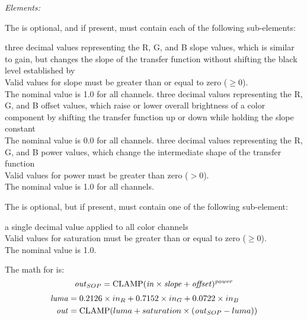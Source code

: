 \emph{Elements:}
\begin{xmlfields}
	\xmlitem[SOPNode][optional] The  is optional, and if present, must contain each of the following sub-elements:
	\begin{xmlfields}
		\xmlitemd[Slope] three decimal values representing the R, G, and B slope values, which 
		is similar to gain, but changes the slope of the transfer function without shifting the black level established by  \\
		Valid values for slope must be greater than or equal to zero ($\geq 0$). \\
		The nominal value is 1.0 for all channels.
		\xmlitemd[Offset] three decimal values representing the R, G, and B offset values, which raise or lower overall brightness of a color component by shifting the transfer function up or down while holding the slope constant \\
		The nominal value is 0.0 for all channels.
		\xmlitemd[Power] three decimal values representing the R, G, and B power values, which change the intermediate shape of the transfer function \\
		Valid values for power must be greater than zero ($> 0$). \\
        The nominal value is 1.0 for all channels.
	\end{xmlfields}
	\xmlitem[SatNode][optional] The  is optional, but if present, must contain one of the following sub-element:
	\begin{xmlfields} 
		\xmlitemd[Saturation] a single decimal value applied to all color channels \\
		Valid values for saturation must be greater than or equal to zero ($\geq 0$). \\
        The nominal value is 1.0.
	\end{xmlfields}
\end{xmlfields}



The math for  is:
\begin{equation} \label{eq:cdl-fwd}
    \text{\emph{out}}_{SOP} = \mathrm{CLAMP}(\text{\emph{in}} \times \text{\emph{slope}} + \text{\emph{offset}})^{\text{\emph{power}}} \\
\end{equation}
\begin{equation}
	\begin{aligned}
		\text{\emph{luma}} &= 0.2126 \times in_R + 0.7152 \times in_G + 0.0722 \times in_B \\
		\text{\emph{out}} &= \mathrm{CLAMP}(luma + saturation \times (\text{\emph{out}}_{SOP} - luma))
	\end{aligned}
\end{equation}

